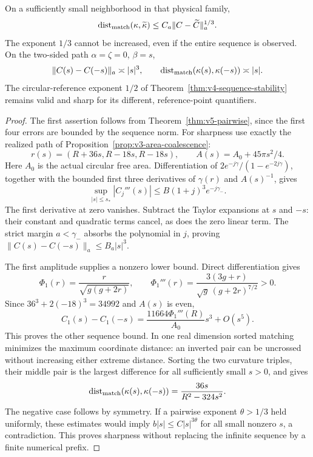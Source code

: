 \begin{theorem}\label{thm:v5-sharpness}
On a sufficiently small neighborhood in that physical family,
\[
 \operatorname{dist}_{\rm match}(\kappa,\widetilde\kappa)
       \le C_a\|C-\widetilde C\|_a^{1/3}.
\]
The exponent $1/3$ cannot be increased, even if the entire sequence is
observed. On the two-sided path $\alpha=\zeta=0$, $\beta=s$,
\begin{equation}\label{eq:v5-cubic-path}
 \|C(s)-C(-s)\|_a\asymp |s|^3,\qquad
 \operatorname{dist}_{\rm match}(\kappa(s),\kappa(-s))\asymp |s|.
\end{equation}
The circular-reference exponent $1/2$ of
Theorem~\ref{thm:v4-sequence-stability} remains valid and sharp for
its different, reference-point quantifiers.
\end{theorem}
\begin{proof}
The first assertion follows from Theorem~\ref{thm:v5-pairwise}, since
the first four errors are bounded by the sequence norm. For sharpness
use exactly the realized path of Proposition~\ref{prop:v3-area-coalescence}:
\[
 r(s)=(R+36s,R-18s,R-18s),\qquad A(s)=A_0+45\pi s^2/4.
\]
Here $A_0$ is the actual circular free area. Differentiation of
$2e^{-j\gamma}/(1-e^{-2j\gamma})$, together with the bounded first three
derivatives of $\gamma(r)$ and $A(s)^{-1}$, gives
\[
 \sup_{|s|\le s_*}|C_j'''(s)|
                     \le B(1+j)^3e^{-j\gamma_-}.
\]
The first derivative at zero vanishes. Subtract the Taylor expansions
at $s$ and $-s$: their constant and quadratic terms cancel, as does the
zero linear term. The strict margin $a<\gamma_-$ absorbs the polynomial
in $j$, proving $\|C(s)-C(-s)\|_a\le B_a|s|^3$.

The first amplitude supplies a nonzero lower bound. Direct differentiation
gives
\[
 \Phi_1(r)=\frac r{\sqrt{g(g+2r)}},\qquad
 \Phi_1'''(r)=\frac{3(3g+r)}{\sqrt g\,(g+2r)^{7/2}}>0.
\]
Since $36^3+2(-18)^3=34992$ and $A(s)$ is even,
\begin{equation}\label{eq:v5-cubic-coefficient}
 C_1(s)-C_1(-s)
       =\frac{11664\Phi_1'''(R)}{A_0}s^3+O(s^5).
\end{equation}
This proves the other sequence bound. In one real dimension sorted
matching minimizes the maximum coordinate distance: an inverted pair
can be uncrossed without increasing either extreme distance. Sorting
the two curvature triples, their middle pair is the largest difference
for all sufficiently small $s>0$, and gives
\[
 \operatorname{dist}_{\rm match}(\kappa(s),\kappa(-s))
             =\frac{36s}{R^2-324s^2}.
\]
The negative case follows by symmetry. If a pairwise exponent
$\theta>1/3$ held uniformly, these estimates would imply
$b|s|\le C|s|^{3\theta}$ for all small nonzero $s$, a contradiction.
This proves sharpness without replacing the infinite sequence by a
finite numerical prefix.
\end{proof}

